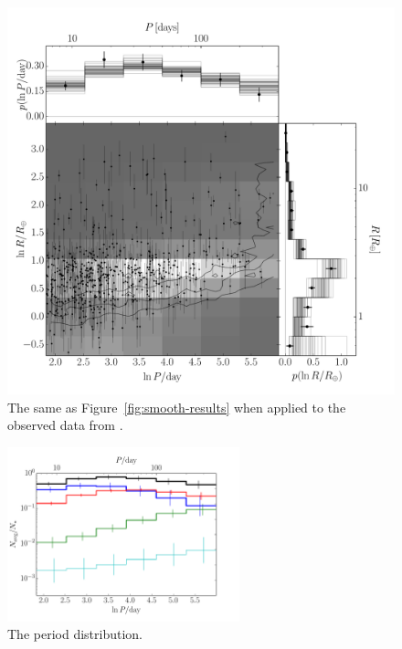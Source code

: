 \documentclass[12pt,preprint]{aastex}
\newcommand{\Fig}[1]{Figure~\ref{fig:#1}}
\newcommand{\fig}[1]{\Fig{#1}}
\newcommand{\figlabel}[1]{\label{fig:#1}}
\begin{document}
\begin{figure}[p]
\begin{center}
\includegraphics[width=\textwidth]{figures/results/results.pdf}
\end{center}
\caption{%
The same as \fig{smooth-results} when applied to the observed data from
\citet{petigura}.
\figlabel{real-results}}
\end{figure}

\begin{figure}[p]
\begin{center}
\includegraphics[width=0.6\textwidth]{figures/results/period.pdf}
\end{center}
\caption{%
The period distribution.
\figlabel{period}}
\end{figure}
\end{document}
